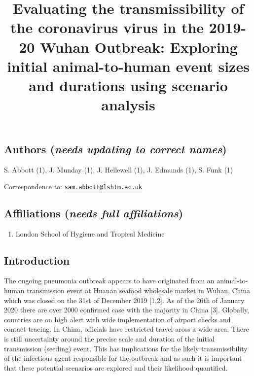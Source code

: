 \documentclass[]{article}
\title{Evaluating the transmissibility of the coronavirus virus in the 2019-20
Wuhan Outbreak: Exploring initial animal-to-human event sizes and
durations using scenario analysis}
\author{}
\date{\vspace{-2.5em}}
\providecommand{\tightlist}{%
  \setlength{\itemsep}{0pt}\setlength{\parskip}{0pt}}
\begin{document}
\maketitle

\hypertarget{authors-needs-updating-to-correct-names}{%
\subsection{\texorpdfstring{Authors (\emph{needs updating to correct
names})}{Authors (needs updating to correct names)}}\label{authors-needs-updating-to-correct-names}}

S. Abbott (1), J. Munday (1), J. Hellewell (1), J. Edmunds (1), S. Funk
(1)

Correspondence to:
\href{mailto:sam.abbott@lshtm.ac.uk}{\nolinkurl{sam.abbott@lshtm.ac.uk}}

\hypertarget{affiliations-needs-full-affiliations}{%
\subsection{\texorpdfstring{Affiliations (\emph{needs full
affiliations})}{Affiliations (needs full affiliations)}}\label{affiliations-needs-full-affiliations}}

\begin{enumerate}
\def\labelenumi{\arabic{enumi}.}
\tightlist
\item
  London School of Hygiene and Tropical Medicine
\end{enumerate}

\hypertarget{introduction}{%
\subsection{Introduction}\label{introduction}}

The ongoing pneumonia outbreak appears to have originated from an
animal-to-human transmission event at Huanan seafood wholesale market in
Wuhan, China which was closed on the 31st of December 2019 {[}1,2{]}. As
of the 26th of January 2020 there are over 2000 confirmed case with the
majority in China {[}3{]}. Globally, countries are on high alert with
wide implementation of airport checks and contact tracing. In China,
officials have restricted travel aross a wide area. There is still
uncertainty around the precise scale and duration of the initial
transmission (seeding) event. This has implications for the likely
transmissibility of the infectious agent responsible for the outbreak
and as such it is important that these potential scenarios are explored
and their likelihood quantified.
\end{document}
